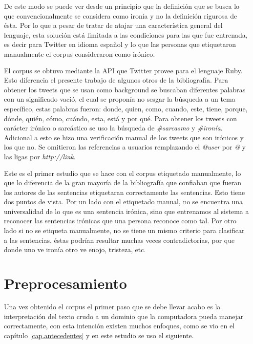 \par De este modo se puede ver desde un principio que la definición que se busca lo que convencionalmente se considera como ironía y no la definición rigurosa de ésta. Por lo que a pesar de tratar de atajar una característica general del lenguaje, esta solución está limitada a las condiciones para las que fue entrenada, es decir para Twitter en idioma español y lo que las personas que etiquetaron manualmente el corpus consideraron como irónico.

\par El corpus se obtuvo mediante la API que Twitter provee para el lenguaje Ruby. Esto diferencia el presente trabajo de algunos otros de la bibliografía. Para obtener los tweets que se usan como background se buscaban diferentes palabras con un significado vació, el cual se proponía no sesgar la búsqueda a un tema específico, estas palabras fueron: donde, quien, como, cuando, este, tiene, porque, dónde, quién, cómo, cuándo, esta, está y por qué. Para obtener los tweets con carácter irónico o sarcástico se uso la búsqueda de \textit{ \#sarcasmo} y \textit{\#ironía}. Adicional a esto se hizo una verificación manual de los tweets que son irónicos y los que no. Se omitieron las referencias a usuarios remplazando el \textit{@user} por \textit{@} y las ligas por \textit{http://link}. 

    \par Este es el primer estudio que se hace con el corpus etiquetado manualmente, lo que lo diferencia de la gran mayoría de la bibliografía que confiaban que fueran los autores de las sentencias etiquetaran correctamente las sentencias. Esto tiene dos puntos de vista. Por un lado con el etiquetado manual, no se encuentra una universalidad de lo que es una sentencia irónica, sino que entrenamos al sistema a reconocer las sentencias irónicas que una persona reconoce como tal. Por otro lado si no se etiqueta manualmente, no se tiene un mismo criterio para clasificar a las sentencias, éstas podrían resultar muchas veces contradictorias, por que donde uno ve ironía otro ve enojo, tristeza, etc. 

\section{Preprocesamiento}
\par Una vez obtenido el corpus el primer paso que se debe llevar acabo es la interpretación del texto crudo a un dominio que la computadora pueda manejar correctamente, con esta intención existen muchos enfoques, como se vio en el capítulo \ref{cap.antecedentes} y en este estudio se uso el siguiente.
